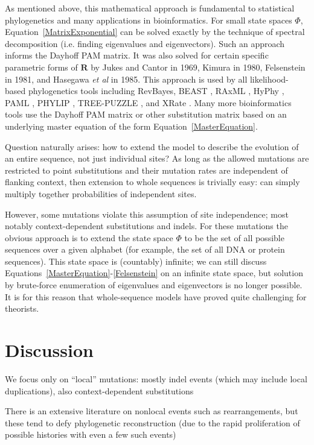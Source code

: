 \documentclass{bmcart}
\newcommand{\matr}[1]{\mathbf{#1}}
\newcommand{\eqref}[1]{Equation~\ref{#1}}
\newcommand{\statespace}{\Phi}
\newcommand{\ratematrix}{\matr{R}}
\begin{document}
As mentioned above, this mathematical approach is fundamental to statistical phylogenetics
and many applications in bioinformatics.
For small state spaces $\statespace$, \eqref{MatrixExponential} can be solved exactly
by the technique of spectral decomposition (i.e. finding eigenvalues and eigenvectors).
Such an approach informs the Dayhoff PAM matrix.
It was also solved for certain specific parametric forms of $\ratematrix$
by Jukes and Cantor in 1969, Kimura in 1980, Felsenstein in 1981, and Hasegawa {\em et al} in 1985.
This approach is used by all likelihood-based phylogenetics tools including
RevBayes\cite{HohnaEtAl2016},
BEAST \cite{pmid17996036},
RAxML \cite{pmid16928733},
HyPhy \cite{pmid15509596},
PAML \cite{pmid17483113},
PHYLIP \cite{Felsenstein1989},
TREE-PUZZLE \cite{pmid11934758},
and XRate \cite{pmid22693624}.
Many more bioinformatics tools use the Dayhoff PAM matrix or other substitution matrix
based on an underlying master equation of the form \eqref{MasterEquation}.

Question naturally arises: how to extend the model to describe the evolution of an entire sequence,
not just individual sites?
As long as the allowed mutations are restricted to point substitutions
and their mutation rates are independent of flanking context,
then extension to whole sequences is trivially easy:
can simply multiply together probabilities of independent sites.

However, some mutations violate this assumption of site independence;
most notably context-dependent substitutions and indels.
For these mutations the obvious approach is to extend the state space $\statespace$
to be the set of all possible sequences over a given alphabet
(for example, the set of all DNA or protein sequences).
This state space is (countably) infinite;
we can still discuss Equations~\ref{MasterEquation}-\ref{Felsenstein}
on an infinite state space,
but solution by brute-force enumeration of eigenvalues and eigenvectors is no longer possible.
It is for this reason that whole-sequence models have proved quite challenging for theorists.

\section*{Discussion}

We focus only on ``local'' mutations: mostly indel events (which may include local duplications),
also context-dependent substitutions

There is an extensive literature on nonlocal events such as rearrangements,
but these tend to defy phylogenetic reconstruction (due to the rapid proliferation of possible histories with even a few such events)
\end{document}
